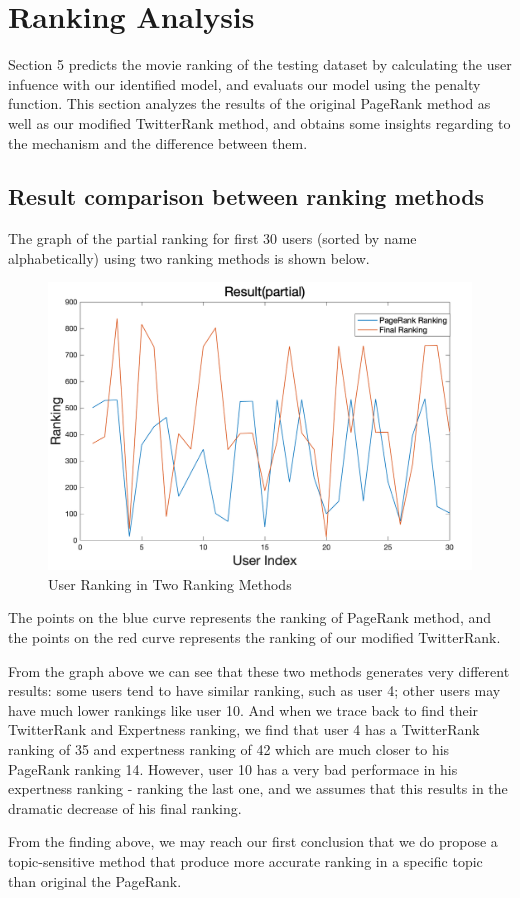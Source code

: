 \documentclass[conference]{IEEEtran}
\theoremstyle{definition}
\begin{document}
\section{Ranking Analysis}
Section 5 predicts the movie ranking of the testing dataset by calculating the user infuence with our identified model, and evaluats our model using the penalty function. This section analyzes the results of the original PageRank method as well as our modified TwitterRank method, and obtains some insights regarding to the mechanism and the difference between them.

\subsection{Result comparison between ranking methods}
The graph of the partial ranking for first 30 users (sorted by name alphabetically) using two ranking methods is shown below.

\begin{figure}[htb]  
	\centering                       
	\includegraphics[width=0.8\linewidth]{2.png}
	\caption{User Ranking in Two Ranking Methods}
	\label{page-our}
\end{figure} 

The points on the blue curve represents the ranking of PageRank method, and the points on the red curve represents the ranking of our modified TwitterRank.\par From the graph above we can see that these two methods generates very different results: some users tend to have similar ranking, such as user 4; other users may have much lower rankings like user 10. And when we trace back to find their TwitterRank and Expertness ranking, we find that user 4 has a TwitterRank ranking of 35 and expertness ranking of 42 which are much closer to his PageRank ranking 14. However, user 10 has a very bad performace in his expertness ranking - ranking the last one, and we assumes that this results in the dramatic decrease of his final ranking. \par
From the finding above, we may reach our first conclusion that we do propose a topic-sensitive method that produce more accurate ranking in a specific topic than original the PageRank.
\end{document}
